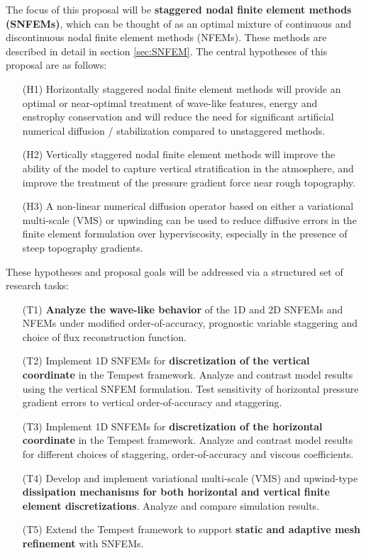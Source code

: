 \documentclass[11pt]{article}
\begin{document}
\vspace{-0.4cm}
The focus of this proposal will be \textbf{staggered nodal finite element methods (SNFEMs)}, which can be thought of as an optimal mixture of continuous and discontinuous nodal finite element methods (NFEMs).  These methods are described in detail in section \ref{sec:SNFEM}.  The central hypotheses of this proposal are as follows:

\vspace{-0.4cm}
\begin{itemize}
\item[(H1)] Horizontally staggered nodal finite element methods will provide an optimal or near-optimal treatment of wave-like features, energy and enstrophy conservation and will reduce the need for significant artificial numerical diffusion / stabilization compared to unstaggered methods.

\item[(H2)] Vertically staggered nodal finite element methods will improve the ability of the model to capture vertical stratification in the atmosphere, and improve the treatment of the pressure gradient force near rough topography.

\item[(H3)] A non-linear numerical diffusion operator based on either a variational multi-scale (VMS) or upwinding can be used to reduce diffusive errors in the finite element formulation over hyperviscosity, especially in the presence of steep topography gradients.
\end{itemize}

These hypotheses and proposal goals will be addressed via a structured set of research tasks:

\vspace{-0.4cm}
\begin{itemize}
\item[(T1)] \textbf{Analyze the wave-like behavior} of the 1D and 2D SNFEMs and NFEMs under modified order-of-accuracy, prognostic variable staggering and choice of flux reconstruction function.

\item[(T2)] Implement 1D SNFEMs for \textbf{discretization of the vertical coordinate} in the Tempest framework.  Analyze and contrast model results using the vertical SNFEM formulation.  Test sensitivity of horizontal pressure gradient errors to vertical order-of-accuracy and staggering.

\item[(T3)] Implement 1D SNFEMs for \textbf{discretization of the horizontal coordinate} in the Tempest framework.  Analyze and contrast model results for different choices of staggering, order-of-accuracy and viscous coefficients.

\item[(T4)] Develop and implement variational multi-scale (VMS) and upwind-type \textbf{dissipation mechanisms for both horizontal and vertical finite element discretizations}.  Analyze and compare simulation results.

\item[(T5)] Extend the Tempest framework to support \textbf{static and adaptive mesh refinement} with SNFEMs.
\end{itemize}
\end{document}
